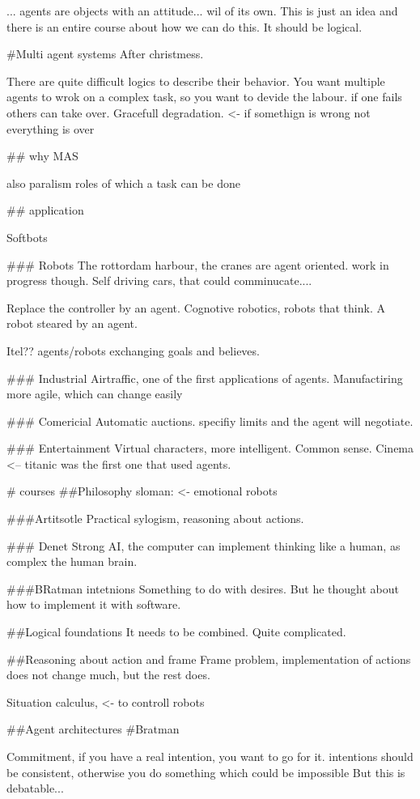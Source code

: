 \documentclass{article}
\begin{document}
... agents are objects with an attitude... wil of its own.
This is just an idea and there is an entire course about how we can do this.
It should be logical.

#Multi agent systems
After christmess.

There are quite difficult logics to describe their behavior.
You want multiple agents to wrok on a complex task, so you want to devide
the labour. if one fails others can take over.
Gracefull degradation. <- if somethign is wrong not everything is over

## why MAS

also paralism
roles of which a task can be done

## application

Softbots

### Robots
The rottordam harbour, the cranes are agent oriented. work in progress though.
Self driving cars, that could comminucate....

Replace the controller by an agent. Cognotive robotics, robots that think.
A robot steared by an agent.

Itel?? agents/robots exchanging goals and believes.

### Industrial
Airtraffic, one of the first applications of agents.
Manufactiring more agile, which can change easily

### Comericial
Automatic auctions. specifiy limits and the agent will negotiate.

### Entertainment
Virtual characters, more intelligent. Common sense.
Cinema <-- titanic was the first one that used agents.

# courses
##Philosophy
sloman: <- emotional robots


###Artitsotle
Practical sylogism, reasoning about actions.

### Denet
Strong AI, the computer can implement thinking like a human, as complex the
human brain.

###BRatman intetnions
Something to do with desires. But he thought about how to implement it with
software.

##Logical foundations
It needs to be combined. Quite complicated.

##Reasoning about action and frame
Frame problem, implementation of actions does not change much, but the rest does.

Situation calculus, <- to controll robots

##Agent architectures
#Bratman

Commitment, if you have a real intention, you want to go for it.
intentions should be consistent, otherwise you do something which could be
impossible
But this is debatable...
\end{document}
